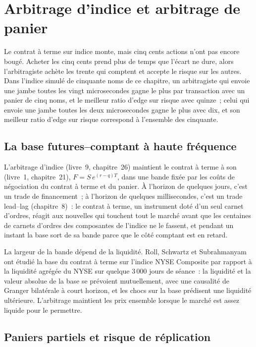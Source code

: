 \chapter{Arbitrage d'indice et arbitrage de panier}\label{ch:hf:index-and-basket-arbitrage}

Le contrat à terme sur indice monte, mais cinq cents actions n'ont pas encore bougé. Acheter les cinq cents prend plus de temps que l'écart ne dure, alors l'arbitragiste
achète les trente qui comptent et accepte le risque sur les autres. Dans l'indice simulé de cinquante noms de ce chapitre, un arbitragiste qui envoie une jambe
toutes les vingt microsecondes gagne le plus par transaction avec un panier de cinq noms, et le meilleur ratio d'edge sur risque avec quinze~; celui qui envoie une jambe
toutes les deux microsecondes gagne le plus avec dix, et son meilleur ratio d'edge sur risque correspond à l'ensemble des cinquante.

\section{La base futures--comptant à haute fréquence}

L'arbitrage d'indice (livre~9, chapitre~26) maintient le contrat à terme à son  (livre~1, chapitre~21), $F=S\,e^{(r-q)T}$, dans une bande fixée par les
coûts de négociation du contrat à terme et du panier. À l'horizon de quelques jours, c'est un trade de financement~; à l'horizon de quelques millisecondes, c'est un trade lead--lag
(chapitre~8)~: le contrat à terme, un instrument doté d'un seul carnet d'ordres, réagit aux nouvelles qui touchent tout le marché avant que les centaines de carnets d'ordres
des composantes de l'indice ne le fassent, et pendant un instant la base sort de sa bande parce que le côté comptant est en retard.

La largeur de la bande dépend de la liquidité. Roll, Schwartz et Subrahmanyam ont étudié la base du contrat à terme sur l'indice NYSE Composite par rapport à la
liquidité agrégée du NYSE sur quelque 3\,000 jours de séance~: la liquidité et la valeur absolue de la base se prévoient mutuellement, avec une causalité de Granger
bilatérale à court horizon, et les chocs sur la base prédisent une liquidité ultérieure. L'arbitrage maintient les prix ensemble lorsque le marché est assez liquide pour le permettre.

\section{Paniers partiels et risque de réplication}

